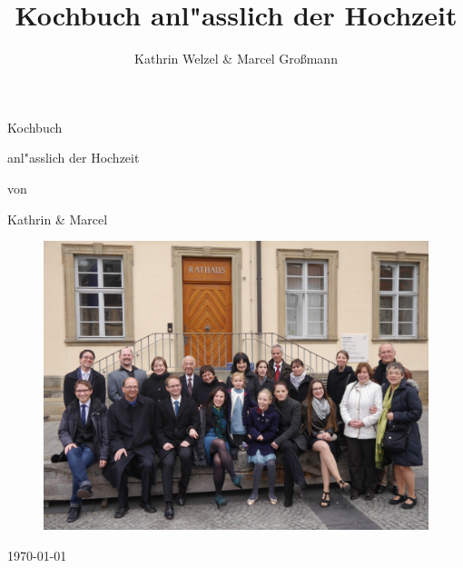 \documentclass[%
a4paper,
twoside,
12pt
]{article}
\begin{document}
\title{Kochbuch anl"asslich der Hochzeit}
\author{Kathrin Welzel \& Marcel Gro{\ss}mann}

\begin{titlepage}
	\centering\fontsize{80pt}{80pt}\selectfont

	Kochbuch
	
	\huge
	anl"asslich der Hochzeit
	
	von
	
	\fontsize{40pt}{40pt}\selectfont
	Kathrin \& Marcel
	
	\vfill
	\begin{figure}[h]
		\includegraphics[width=\textwidth]{pic/front.jpg}
	\end{figure}
\LARGE
	\today
\end{titlepage}
\thispagestyle{empty}



\cleardoublepage
\tableofcontents


\cleardoublepage


\end{document}
